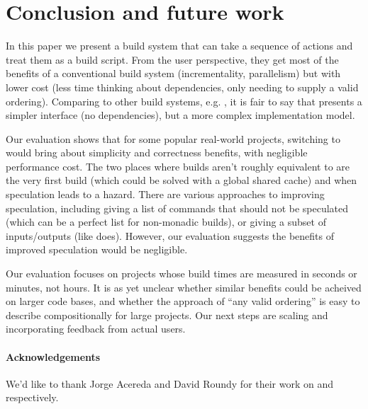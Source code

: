 \section{Conclusion and future work}
\label{sec:conclusion}

In this paper we present a build system that can take a sequence of actions and treat them as a build script. From the user perspective, they get most of the benefits of a conventional build system (incrementality, parallelism) but with lower cost (less time thinking about dependencies, only needing to supply a valid ordering). Comparing \Rattle to other build systems, e.g. \Make, it is fair to say that \Rattle presents a simpler interface (no dependencies), but a more complex implementation model.

Our evaluation shows that for some popular real-world projects, switching to \Rattle would bring about simplicity and correctness benefits, with negligible performance cost. The two places where builds aren't roughly equivalent to \Make are the very first build (which could be solved with a global shared cache) and when speculation leads to a hazard. There are various approaches to improving speculation, including giving a list of commands that should not be speculated (which can be a perfect list for non-monadic builds), or giving a subset of inputs/outputs (like \Fac does). However, our evaluation suggests the benefits of improved speculation would be negligible.

Our evaluation focuses on projects whose build times are measured in seconds or minutes, not hours. It is as yet unclear whether similar benefits could be acheived on larger code bases, and whether the \Rattle approach of ``any valid ordering'' is easy to describe compositionally for large projects. Our next steps are scaling \Rattle and incorporating feedback from actual users.

\paragraph{Acknowledgements} We'd like to thank Jorge Acereda and David Roundy for their work on \Fsatrace and \Bigbro respectively.
